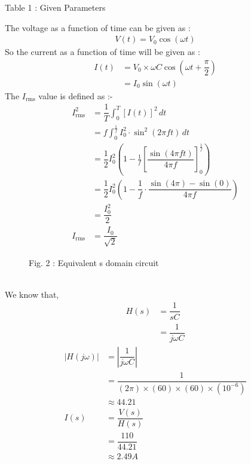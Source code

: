 \documentclass[journal,12pt,twocolumn]{IEEEtran}
\theoremstyle{remark}
\begin{document}
\begin{table}[htbp]
\centering
\resizebox{\columnwidth}{!}{
}

\caption*{Table 1 : Given Parameters}
\label{tab:my_label}
\end{table}
The voltage as a function of time can be given as :
\begin{align}
V(t) = V_0 \cos(\omega t)
\end{align}
So the current as a function of time will be given as :
\begin{align}
I(t) &= V_0 \times \omega C  \cos(\omega t + \dfrac{\pi}{2}) \\
&=I_0 \sin(\omega t)
\end{align}
The $I_{\text{rms}}$ value is defined as :-
\begin{align}
I_{\text{rms}}^2 &= {\dfrac{1}{T} \int_{0}^{T} [I(t)]^2 \, dt} \\
&= {f \int_{0}^{\frac{1}{f}} I_{\text{0}}^2 \cdot \sin^2(2\pi ft) \, dt} \\
&= \dfrac{1}{2} I_{0}^2 \left(1 - \frac{1}{f}\left[\dfrac{\sin(4\pi ft )}{4\pi f}\right]_{0}^{\frac{1}{f}}\right) \\
&= \dfrac{1}{2} I_{0}^2 \left(1 - \dfrac{1}{f} \cdot \dfrac{\sin\left(4\pi \right) - \sin(0 )}{4\pi f}\right) \\
&= \dfrac{I_{0}^2}{2} \\
I_{\text{rms}}&=\dfrac{I_{0}}{\sqrt{2}}
\end{align}
\begin{figure}[htbp]
 \centering
    
    \caption*{Fig. 2 : Equivalent s domain circuit}
    \label{fig:enter-label}
\end{figure} \\
We know that,
\begin{align}
 H(s)&= \dfrac{1}{sC}\\
&=\dfrac{1}{j \omega C}
\end{align}
\begin{align}
 |H(j \omega)| &= \left|\dfrac{1}{j \omega C}\right|\\
 &= \dfrac{1}{{ (2\pi) \times(60)\times(60) \times (10^{-6})}}\\
&\approx 44.21\\
I(s) &= \dfrac{V(s)}{H(s)} \\
&=\dfrac{110}{44.21} \\
&\approx 2.49  A
\end{align}
\end{document}
